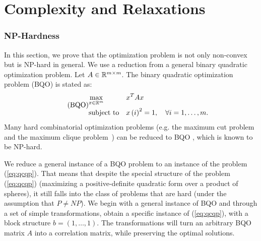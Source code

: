 %
\chapter{Complexity and Relaxations}\label{sec:crosslingual}

\subsection{NP-Hardness}\label{subsec:nphard}
In this section, we prove that the optimization problem is not only
non-convex but is NP-hard in general. We use a reduction from a general binary quadratic
optimization problem.
%
%
Let $A   \in \mathbb{R}^{m\times m}$.  %
The binary quadratic optimization problem (BQO) is stated as:
\begin{equation}\label{eq:binqp}
\tag{BQO}
\begin{aligned}
& \underset{x \in \mathbb{R}^m}{\text{max}}
& & x^T A x  \\
& \text{subject to}
& & x\left(i\right)^2 = 1,  \quad\forall i =1,\ldots,m.\\
\end{aligned}
\end{equation}
Many hard combinatorial optimization problems (e.g. the
maximum cut  problem and the maximum clique problem~\cite{Garey:1990:CIG:574848}) can be reduced to
BQO \cite{Goemans95improvedapproximation}, which is known to be NP-hard.


We reduce a general instance of a  BQO problem to an
instance of the problem (\ref{eq:qcqp}). That means that despite the special
structure of the
problem (\ref{eq:qcqp}) (maximizing a positive-definite quadratic form over a
product of spheres), it still falls into the class of problems that are hard (under the assumption that $P \neq NP$).
We begin with a general instance of BQO and through a set of simple transformations, obtain a specific
instance of (\ref{eq:qcqp}), with a block structure $b =
\left(1,\ldots,1\right)$. The transformations will turn an arbitrary
BQO matrix $A$ into a correlation matrix, while preserving  the optimal solutions.


